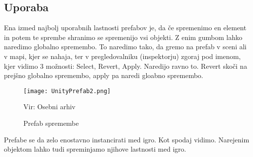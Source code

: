 {\color{indiagreen}\subsection{Uporaba}}
Ena izmed najbolj uporabnih lastnosti prefabov je, da če spremenimo en element in potem te sprembe shranimo se spremenijo vsi objekti. Z enim gumbom lahko naredimo globalno spremembo. To naredimo tako, da gremo na prefab v sceni ali v mapi, kjer se nahaja, ter v pregledovalniku (inspektorju) zgoraj pod imenom, kjer vidimo 3 možnosti: Select, Revert, Apply. Naredijo ravno to. Revert skoči na prejšno globalno spremembo, apply pa naredi gloabno spremembo.
\begin{figure}[ht!]
	\centering
	\texttt{[image: UnityPrefab2.png]}
	\caption{Prefab spremembe}
	{\tiny Vir: Osebni arhiv}
\end{figure}
Prefabe se da zelo enostavno instancirati med igro. Kot spodaj vidimo. Narejenim objektom lahko tudi spreminjamo njihove lastnosti med igro.
